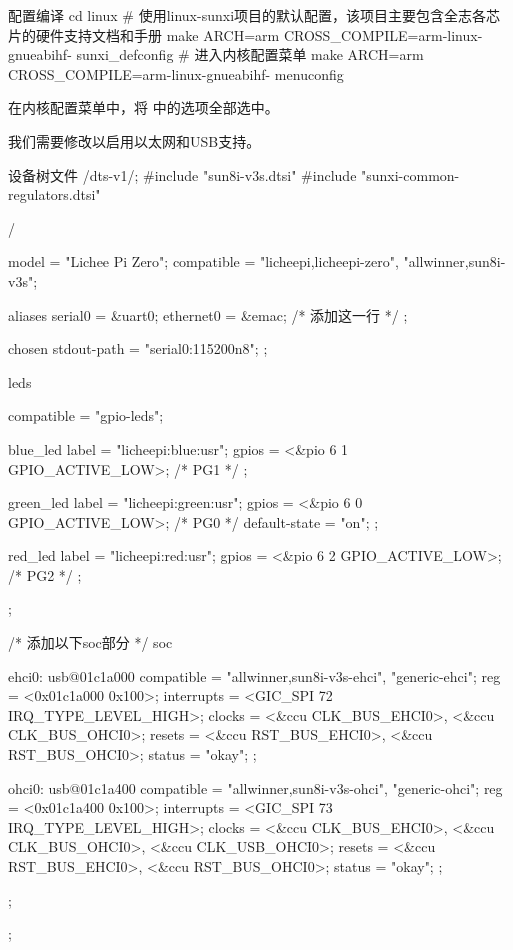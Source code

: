 \documentclass[lang=cn,newtx,10pt,scheme=chinese]{elegantbook}
\begin{document}
\begin{mycode}{配置编译}
cd linux
# 使用linux-sunxi项目的默认配置，该项目主要包含全志各芯片的硬件支持文档和手册
make ARCH=arm CROSS_COMPILE=arm-linux-gnueabihf- sunxi_defconfig
# 进入内核配置菜单
make ARCH=arm CROSS_COMPILE=arm-linux-gnueabihf- menuconfig
\end{mycode}

\begin{marker}
    在内核配置菜单中，将  中的选项全部选中。
\end{marker}

我们需要修改以启用以太网和USB支持。

\begin{mycode}{设备树文件}
/dts-v1/;
#include "sun8i-v3s.dtsi"
#include "sunxi-common-regulators.dtsi"

/ {
    model = "Lichee Pi Zero";
    compatible = "licheepi,licheepi-zero", "allwinner,sun8i-v3s";

    aliases {
        serial0 = &uart0;
        ethernet0 = &emac; /* 添加这一行 */
    };

    chosen {
        stdout-path = "serial0:115200n8";
    };

    leds {
        compatible = "gpio-leds";

        blue_led {
            label = "licheepi:blue:usr";
            gpios = <&pio 6 1 GPIO_ACTIVE_LOW>; /* PG1 */
        };

        green_led {
            label = "licheepi:green:usr";
            gpios = <&pio 6 0 GPIO_ACTIVE_LOW>; /* PG0 */
            default-state = "on";
        };

        red_led {
            label = "licheepi:red:usr";
            gpios = <&pio 6 2 GPIO_ACTIVE_LOW>; /* PG2 */
        };
    };

  /* 添加以下soc部分 */
    soc {
        ehci0: usb@01c1a000 {
            compatible = "allwinner,sun8i-v3s-ehci", "generic-ehci";
            reg = <0x01c1a000 0x100>;
            interrupts = <GIC_SPI 72 IRQ_TYPE_LEVEL_HIGH>;
            clocks = <&ccu CLK_BUS_EHCI0>, <&ccu CLK_BUS_OHCI0>;
            resets = <&ccu RST_BUS_EHCI0>, <&ccu RST_BUS_OHCI0>;
            status = "okay";
        };

        ohci0: usb@01c1a400 {
            compatible = "allwinner,sun8i-v3s-ohci", "generic-ohci";
            reg = <0x01c1a400 0x100>;
            interrupts = <GIC_SPI 73 IRQ_TYPE_LEVEL_HIGH>;
            clocks = <&ccu CLK_BUS_EHCI0>, <&ccu CLK_BUS_OHCI0>,
            <&ccu CLK_USB_OHCI0>;
            resets = <&ccu RST_BUS_EHCI0>, <&ccu RST_BUS_OHCI0>;
            status = "okay";
        };
    };
};


\end{mycode}
\end{document}
